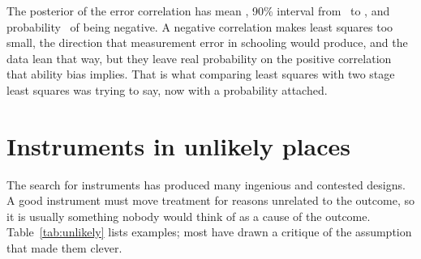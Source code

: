 The posterior of the error correlation has mean \ivcardrho, 90\% interval from \ivcardrholo\ to \ivcardrhohi, and probability \ivcardrhopneg\ of being negative. A negative correlation makes least squares too small, the direction that measurement error in schooling would produce, and the data lean that way, but they leave real probability on the positive correlation that ability bias implies. That is what comparing least squares with two stage least squares was trying to say, now with a probability attached.

\section{Instruments in unlikely places}\label{iv:sec:unlikely}

The search for instruments has produced many ingenious and contested designs. A good instrument must move treatment for reasons unrelated to the outcome, so it is usually something nobody would think of as a cause of the outcome. Table~\ref{tab:unlikely} lists examples; most have drawn a critique of the assumption that made them clever.

